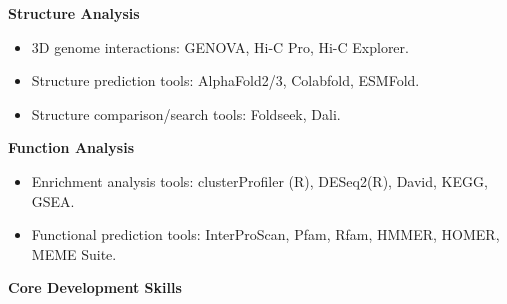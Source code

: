 \textbf{Structure Analysis}
\begin{itemize}
    \item 3D genome interactions: GENOVA, Hi-C Pro, Hi-C Explorer.
    \item Structure prediction tools: AlphaFold2/3, Colabfold, ESMFold.
    \item Structure comparison/search tools: Foldseek, Dali.
\end{itemize}

\textbf{Function Analysis}
\begin{itemize}
    \item Enrichment analysis tools: clusterProfiler (R), DESeq2(R), David, KEGG, GSEA.
    \item Functional prediction tools: InterProScan, Pfam, Rfam, HMMER, HOMER, MEME Suite.
\end{itemize}


\textbf{Core Development Skills}\\

